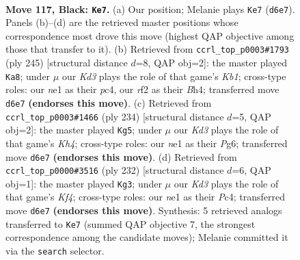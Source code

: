 \documentclass[11pt]{article}
\begin{document}
\clearpage

\begin{figure}[p]\centering
\begin{subfigure}{0.46\textwidth}\centering
\resizebox{\linewidth}{!}{%
\newchessgame
\chessboard[
  setfen={8/8/3k4/6K1/6P1/1r6/5R2/4N3 b - - 18 117},
  showmover=false,
  pgfstyle=straightmove, color=movearrow, markmove={d6-e7}
]}
\caption{}
\end{subfigure}\hfill
\begin{subfigure}{0.46\textwidth}\centering
\resizebox{\linewidth}{!}{%
\newchessgame
\chessboard[
  setfen={1k6/8/K7/P7/2P4b/7B/8/8 b - - 8 123},
  showmover=false,
  pgfstyle=straightmove, color=movearrow, markmove={b8-a8}
]}
\caption{}
\end{subfigure}
\\[4pt]
\begin{subfigure}{0.46\textwidth}\centering
\resizebox{\linewidth}{!}{%
\newchessgame
\chessboard[
  setfen={8/5R2/4p1P1/4k3/7K/8/8/2r5 w - - 0 118},
  showmover=false,
  pgfstyle=straightmove, color=movearrow, markmove={h4-g5}
]}
\caption{}
\end{subfigure}\hfill
\begin{subfigure}{0.46\textwidth}\centering
\resizebox{\linewidth}{!}{%
\newchessgame
\chessboard[
  setfen={8/7R/1k6/2p5/2P2K2/8/r7/8 w - - 19 117},
  showmover=false,
  pgfstyle=straightmove, color=movearrow, markmove={f4-g3}
]}
\caption{}
\end{subfigure}
\caption{\textbf{Move 117, Black: \texttt{Ke7}.} (a) Our position; Melanie plays \texttt{Ke7} (\texttt{d6e7}). Panels (b)--(d) are the retrieved master positions whose correspondence most drove this move (highest QAP objective among those that transfer to it). (b) Retrieved from \texttt{ccrl\_top\_p0003\#1793} (ply 245) [structural distance $d$=8, QAP obj=2]: the master played \texttt{Ka8}; under $\mu$ our \emph{Kd3} plays the role of that game's \emph{Kb1}; cross-type roles: our \emph{n}e1 as their \emph{p}c4, our \emph{r}f2 as their \emph{B}h4; transferred move \texttt{d6e7} \textbf{(endorses this move)}. (c) Retrieved from \texttt{ccrl\_top\_p0003\#1466} (ply 234) [structural distance $d$=5, QAP obj=2]: the master played \texttt{Kg5}; under $\mu$ our \emph{Kd3} plays the role of that game's \emph{Kh4}; cross-type roles: our \emph{n}e1 as their \emph{P}g6; transferred move \texttt{d6e7} \textbf{(endorses this move)}. (d) Retrieved from \texttt{ccrl\_top\_p0000\#3516} (ply 232) [structural distance $d$=6, QAP obj=1]: the master played \texttt{Kg3}; under $\mu$ our \emph{Kd3} plays the role of that game's \emph{Kf4}; cross-type roles: our \emph{n}e1 as their \emph{P}c4; transferred move \texttt{d6e7} \textbf{(endorses this move)}. Synthesis: 5 retrieved analogs transferred to \texttt{Ke7} (summed QAP objective 7, the strongest correspondence among the candidate moves); Melanie committed it via the \texttt{search} selector.}
\label{fig:thought-m233}
\end{figure}
\end{document}
